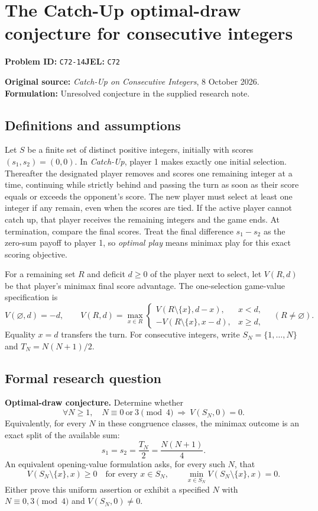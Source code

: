 \documentclass[11pt,a4paper]{article}
\begin{document}
\section*{The Catch-Up optimal-draw conjecture for consecutive integers}
\textbf{Problem ID:} \texttt{C72-14}\quad \textbf{JEL:} \texttt{C72}\par
\label{problem:OP-0589}
\label{supp:catchup}

\noindent\textbf{Original source:} \emph{Catch-Up on Consecutive Integers}, 8 October 2026.
\textbf{Formulation:} Unresolved conjecture in the supplied research note.

\subsection*{Definitions and assumptions}

Let $S$ be a finite set of distinct positive integers, initially with scores
$(s_1,s_2)=(0,0)$. In \emph{Catch-Up}, player 1 makes exactly one initial
selection. Thereafter the designated player removes and scores one remaining
integer at a time, continuing while strictly behind and passing the turn as
soon as their score equals or exceeds the opponent's score. The new player
must select at least one integer if any remain, even when the scores are tied.
If the active player cannot catch up, that player receives the remaining
integers and the game ends. At termination, compare the final scores. Treat
the final difference $s_1-s_2$ as the zero-sum payoff to player 1, so
\emph{optimal play} means minimax play for this exact scoring objective.

For a remaining set $R$ and deficit $d\ge0$ of the player next to select,
let $V(R,d)$ be that player's minimax final score advantage. The
one-selection game-value specification is
\[
V(\varnothing,d)=-d,\qquad
V(R,d)=\max_{x\in R}
\begin{cases}
	V(R\setminus\{x\},d-x),&x<d,\\[2pt]
	-V(R\setminus\{x\},x-d),&x\ge d,
\end{cases}\quad(R\ne\varnothing).
\]
Equality $x=d$ transfers the turn. For consecutive integers, write
$S_N=\{1,\ldots,N\}$ and $T_N=N(N+1)/2$.

\subsection*{Formal research question}

\textbf{Optimal-draw conjecture.} Determine whether
\[
\boxed{\quad \forall N\ge1,\quad
	N\equiv0\ \text{or}\ 3\pmod4
	\ \Longrightarrow\ V(S_N,0)=0.\quad}
\]
Equivalently, for every $N$ in these congruence classes, the minimax
outcome is an exact split of the available sum:
\[
s_1=s_2=\frac{T_N}{2}=\frac{N(N+1)}4.
\]
An equivalent opening-value formulation asks, for every such $N$, that
\[
V(S_N\setminus\{x\},x)\ge0\quad\text{for every }x\in S_N,
\qquad
\min_{x\in S_N}V(S_N\setminus\{x\},x)=0.
\]
Either prove this uniform assertion or exhibit a specified $N$ with
$N\equiv0,3\pmod4$ and $V(S_N,0)\ne0$.
\end{document}
